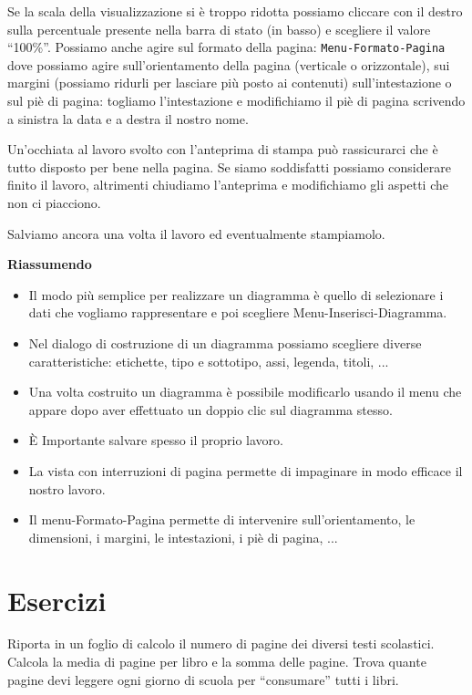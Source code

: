 Se la scala della visualizzazione si è troppo ridotta possiamo cliccare
con il destro sulla percentuale presente nella barra di stato (in basso)
e scegliere il valore ``100\%''. Possiamo anche agire sul formato della pagina:
\texttt{Menu-Formato-Pagina} dove possiamo agire sull'orientamento della pagina
(verticale o orizzontale), sui margini
(possiamo ridurli per lasciare più posto ai contenuti)
sull'intestazione o sul piè di pagina: togliamo l'intestazione e modifichiamo
il piè di pagina scrivendo a sinistra la data e a destra il nostro nome.

Un'occhiata al lavoro svolto con l'anteprima di stampa può rassicurarci che
è tutto disposto per bene nella pagina.
Se siamo soddisfatti possiamo considerare finito il lavoro, altrimenti
chiudiamo l'anteprima e modifichiamo gli aspetti che non ci piacciono.

Salviamo ancora una volta il lavoro ed eventualmente stampiamolo.

\textbf{Riassumendo}

\begin{itemize} [noitemsep]
\item Il modo più semplice per realizzare un diagramma è quello di selezionare
i dati che vogliamo rappresentare e poi scegliere Menu-Inserisci-Diagramma.
\item Nel dialogo di costruzione di un diagramma possiamo scegliere diverse
caratteristiche: etichette, tipo e sottotipo, assi, legenda, titoli, ...
\item Una volta costruito un diagramma è possibile modificarlo usando il menu
che appare dopo aver effettuato un doppio clic sul diagramma stesso.
\item È Importante salvare spesso il proprio lavoro.
\item La vista con interruzioni di pagina permette di impaginare in modo 
efficace il nostro lavoro.
\item Il menu-Formato-Pagina permette di intervenire sull'orientamento,
le dimensioni, i margini, le intestazioni, i piè di pagina, ...
\end{itemize}

\section{Esercizi}
\label{05_01_f_di_calc:esercizi}

\begin{esercizio}
Riporta in un foglio di calcolo il numero di pagine dei diversi testi
scolastici. Calcola la media di pagine per libro e la somma delle pagine.
Trova quante pagine devi leggere ogni giorno di scuola per
``consumare'' tutti i libri.
\end{esercizio}

